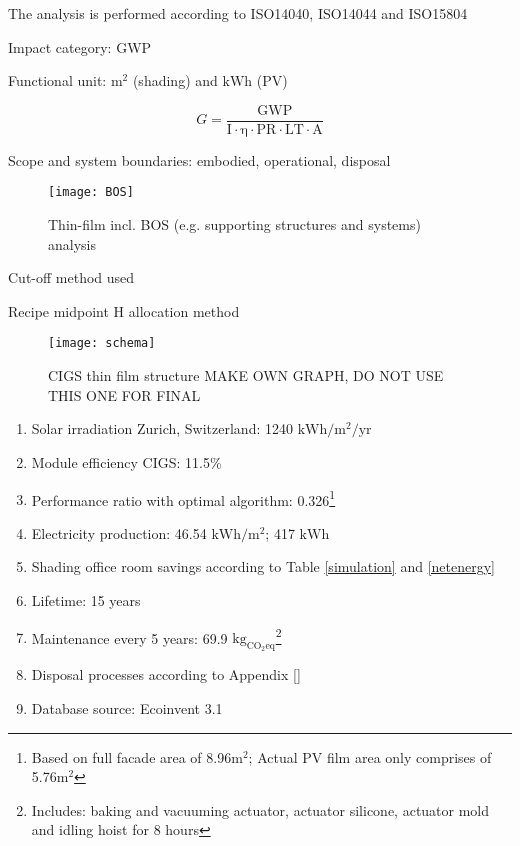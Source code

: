 The analysis is performed according to ISO14040, ISO14044 and ISO15804

Impact category: GWP

Functional unit: ${\mathrm{m^2}}$ (shading) and ${\mathrm{kWh}}$ (PV)

\begin{equation}
G=\frac{{\mathrm{GWP}}}{{\mathrm{I \cdot \eta  \cdot PR \cdot LT \cdot A}}}
\label{solar}
\end{equation}

Scope and system boundaries: embodied, operational, disposal

\begin{figure}[H]
\begin{center}
\texttt{[image: BOS]}
\caption{Thin-film incl. BOS (e.g. supporting structures and systems) analysis}
\label{BOS}
\end{center}
\end{figure}

Cut-off method used

Recipe midpoint H allocation method

\begin{figure}[H]
\begin{center}
\texttt{[image: schema]}
\caption{CIGS thin film structure MAKE OWN GRAPH, DO NOT USE THIS ONE FOR FINAL}
\label{schema}
\end{center}
\end{figure}

\begin{enumerate}
\item Solar irradiation Zurich, Switzerland: 1240 ${\mathrm{kWh/m^2/yr}}$
\item Module efficiency CIGS: 11.5\%
\item Performance ratio with optimal algorithm: 0.326\footnote{Based on full facade area of 8.96${\mathrm{m^2}}$; Actual PV film area only comprises of 5.76${\mathrm{m^2}}$}
\item Electricity production: 46.54 ${\mathrm{kWh/m^2}}$; 417 ${\mathrm{kWh}}$
\item Shading office room savings according to Table \ref{simulation} and \ref{netenergy}
\item Lifetime: 15 years
\item Maintenance every 5 years: 69.9 ${\mathrm{kg_{CO_2eq}}}$\footnote{Includes: baking and vacuuming actuator, actuator silicone, actuator mold and idling hoist for 8 hours}
\item Disposal processes according to Appendix \ref{}
\item Database source: Ecoinvent 3.1
\end{enumerate}